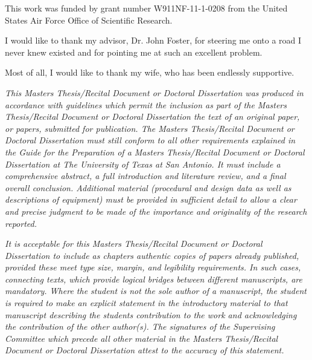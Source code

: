 \author{James O'Grady}
\maketitle
\begin{acknowledgements}
This work was funded by grant number W911NF-11-1-0208 from the United States Air Force Office of Scientific Research. 

I would like to thank my advisor, Dr. John Foster, for steering me onto a road I never knew existed and for pointing me at such an excellent problem.

Most of all, I would like to thank my wife, who has been endlessly supportive.


\begin{singlespace}
\emph{This Masters Thesis/Recital Document or Doctoral Dissertation
was produced in accordance with guidelines which permit the inclusion
as part of the Masters Thesis/Recital Document or Doctoral Dissertation
the text of an original paper, or papers, submitted for publication.
The Masters Thesis/Recital Document or Doctoral Dissertation must
still conform to all other requirements explained in the Guide for
the Preparation of a Masters Thesis/Recital Document or Doctoral Dissertation
at The University of Texas at San Antonio. It must include a comprehensive
abstract, a full introduction and literature review, and a final overall
conclusion. Additional material (procedural and design data as well
as descriptions of equipment) must be provided in sufficient detail
to allow a clear and precise judgment to be made of the importance
and originality of the research reported. }

\emph{It is acceptable for this Masters Thesis/Recital Document or
Doctoral Dissertation to include as chapters authentic copies of papers
already published, provided these meet type size, margin, and legibility
requirements. In such cases, connecting texts, which provide logical
bridges between different manuscripts, are mandatory. Where the student
is not the sole author of a manuscript, the student is required to
make an explicit statement in the introductory material to that manuscript
describing the students contribution to the work and acknowledging
the contribution of the other author(s). The signatures of the Supervising
Committee which precede all other material in the Masters Thesis/Recital
Document or Doctoral Dissertation attest to the accuracy of this statement.}\end{singlespace}
\end{acknowledgements}
